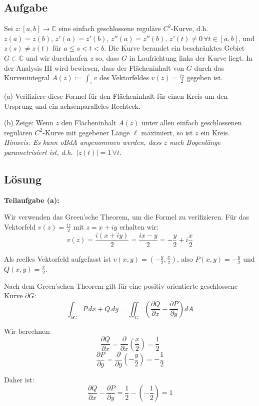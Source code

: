 \documentclass{article}
\newcommand{\C}{\mathbb{C}}
\begin{document}
\subsection*{Aufgabe}

Sei $z:[a,b]\to\C$ eine einfach geschlossene reguläre $C^2$-Kurve,
d.h.~$z(a)=z(b)$, $z'(a)=z'(b)$, $z''(a)=z''(b)$, $z'(t)\neq
0\,\forall t\in[a,b]$, und $z(s)\neq z(t)$ für $a\leq s<t<b$. Die
Kurve berandet ein beschränktes Gebiet $G\subset \C$ und wir
durchlaufen $z$ so, dass $G$ in Laufrichtung links der Kurve liegt.  
In der Analysis III wird bewiesen, dass der Flächeninhalt von $G$ durch das
Kurvenintegral $A(z):=\int_zv$ des Vektorfeldes $v(z)=\frac{iz}{2}$ gegeben ist.

(a) Verifiziere diese Formel für den Flächeninhalt für einen
Kreis um den Ursprung und ein achsenparalleles Rechteck. 

(b) Zeige: Wenn $z$ den Flächeninhalt $A(z)$ unter allen einfach
geschlossenen regulären $C^2$-Kurve mit gegebener Länge $\ell$
maximiert, so ist $z$ ein Kreis.
{\em Hinweis: Es kann oBdA angenommen werden, dass $z$ nach
  Bogenlänge parametrisiert ist, d.h.~$|\dot z(t)|=1\,\forall t$.}

\subsection*{Lösung}

\textbf{Teilaufgabe (a):}

Wir verwenden das Green'sche Theorem, um die Formel zu verifizieren. Für das Vektorfeld $v(z) = \frac{iz}{2}$ mit $z = x + iy$ erhalten wir:
$$v(z) = \frac{i(x+iy)}{2} = \frac{ix - y}{2} = -\frac{y}{2} + i\frac{x}{2}$$

Als reelles Vektorfeld aufgefasst ist $v(x,y) = \left(-\frac{y}{2}, \frac{x}{2}\right)$, also $P(x,y) = -\frac{y}{2}$ und $Q(x,y) = \frac{x}{2}$.

Nach dem Green'schen Theorem gilt für eine positiv orientierte geschlossene Kurve $\partial G$:
$$\int_{\partial G} P\,dx + Q\,dy = \iint_G \left(\frac{\partial Q}{\partial x} - \frac{\partial P}{\partial y}\right) dA$$

Wir berechnen:
$$\frac{\partial Q}{\partial x} = \frac{\partial}{\partial x}\left(\frac{x}{2}\right) = \frac{1}{2}$$
$$\frac{\partial P}{\partial y} = \frac{\partial}{\partial y}\left(-\frac{y}{2}\right) = -\frac{1}{2}$$

Daher ist:
$$\frac{\partial Q}{\partial x} - \frac{\partial P}{\partial y} = \frac{1}{2} - \left(-\frac{1}{2}\right) = 1$$
\end{document}
